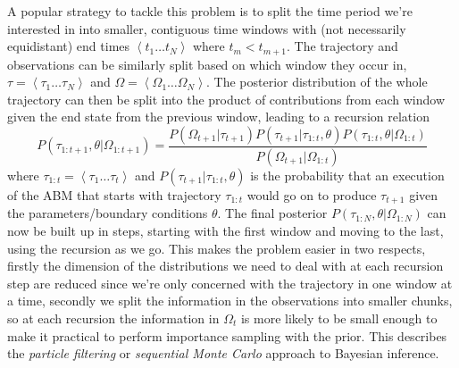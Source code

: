 \documentclass{article}
\begin{document}
A popular strategy to tackle this problem is to split the time period we're interested in into smaller, contiguous time windows with (not necessarily equidistant) end times $\left<t_1 \dots t_N\right>$ where $t_m < t_{m+1}$. The trajectory and observations can be similarly split based on which window they occur in, $\tau = \left<\tau_1 \dots \tau_N\right>$ and $\Omega = \left<\Omega_1 \dots \Omega_N\right>$. The posterior distribution of the whole trajectory can then be split into the product of contributions from each window given the end state from the previous window, leading to a recursion relation
\begin{equation}
P\left(\tau_{1:t+1}, \theta | \Omega_{1:t+1}\right)
=
\frac{ P(\Omega_{t+1}|\tau_{t+1})
P(\tau_{t+1}|\tau_{1:t},\theta) P\left(\tau_{1:t},\theta| \Omega_{1:t}\right)
}
{	P(\Omega_{t+1}| \Omega_{1:t}) }
\label{bayesrecursion}
\end{equation}
where $\tau_{1:t} = \left<\tau_1 \dots \tau_t\right>$ and $P(\tau_{t+1}|\tau_{1:t},\theta)$ is the probability that an execution of the ABM that starts with trajectory $\tau_{1:t}$ would go on to produce $\tau_{t+1}$ given the parameters/boundary conditions $\theta$. The final posterior $P(\tau_{1:N},\theta|\Omega_{1:N})$ can now be built up in steps, starting with the first window and moving to the last, using the recursion as we go. This makes the problem easier in two respects, firstly the dimension of the distributions we need to deal with at each recursion step are reduced since we're only concerned with the trajectory in one window at a time, secondly we split the information in the observations into smaller chunks, so at each recursion the information in $\Omega_t$ is more likely to be small enough to make it practical to perform importance sampling with the prior. This describes the \textit{particle filtering} or \textit{sequential Monte Carlo} approach to Bayesian inference.
\end{document}
